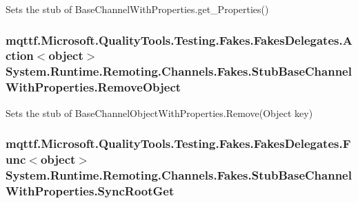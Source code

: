 Sets the stub of Base\-Channel\-With\-Properties.\-get\-\_\-\-Properties()

\hypertarget{class_system_1_1_runtime_1_1_remoting_1_1_channels_1_1_fakes_1_1_stub_base_channel_with_properties_a88ba238e5392bbcfb87b6050972be22e}{
\subsubsection[{Remove\-Object}]{\setlength{\rightskip}{0pt plus 5cm}mqttf.\-Microsoft.\-Quality\-Tools.\-Testing.\-Fakes.\-Fakes\-Delegates.\-Action$<$object$>$ System.\-Runtime.\-Remoting.\-Channels.\-Fakes.\-Stub\-Base\-Channel\-With\-Properties.\-Remove\-Object}}\label{class_system_1_1_runtime_1_1_remoting_1_1_channels_1_1_fakes_1_1_stub_base_channel_with_properties_a88ba238e5392bbcfb87b6050972be22e}


Sets the stub of Base\-Channel\-Object\-With\-Properties.\-Remove(\-Object key)

\hypertarget{class_system_1_1_runtime_1_1_remoting_1_1_channels_1_1_fakes_1_1_stub_base_channel_with_properties_aa570c6bccd3e42ed18c2215e6a87cfd3}{
\subsubsection[{Sync\-Root\-Get}]{\setlength{\rightskip}{0pt plus 5cm}mqttf.\-Microsoft.\-Quality\-Tools.\-Testing.\-Fakes.\-Fakes\-Delegates.\-Func$<$object$>$ System.\-Runtime.\-Remoting.\-Channels.\-Fakes.\-Stub\-Base\-Channel\-With\-Properties.\-Sync\-Root\-Get}}\label{class_system_1_1_runtime_1_1_remoting_1_1_channels_1_1_fakes_1_1_stub_base_channel_with_properties_aa570c6bccd3e42ed18c2215e6a87cfd3}


